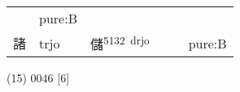 \documentclass[14pt,a4paper]{scrartcl}
\begin{document}
\begin{longtable}[c]{@{}llllll@{}}
\begin{minipage}[t]{0.14\columnwidth}\raggedright\strut
\strut\end{minipage} &
\begin{minipage}[t]{0.14\columnwidth}\raggedright\strut
pure:B
\strut\end{minipage}\tabularnewline
\begin{minipage}[t]{0.14\columnwidth}\raggedright\strut
諸
\strut\end{minipage} &
\begin{minipage}[t]{0.14\columnwidth}\raggedright\strut
trjo
\strut\end{minipage} &
\begin{minipage}[t]{0.14\columnwidth}\raggedright\strut
儲\textsuperscript{5132~drjo}
\strut\end{minipage} &
\begin{minipage}[t]{0.14\columnwidth}\raggedright\strut
\strut\end{minipage} &
\begin{minipage}[t]{0.14\columnwidth}\raggedright\strut
\strut\end{minipage} &
\begin{minipage}[t]{0.14\columnwidth}\raggedright\strut
pure:B
\strut\end{minipage}\tabularnewline
\bottomrule
\end{longtable}

(15) 0046 {[}6{]}
\end{document}
